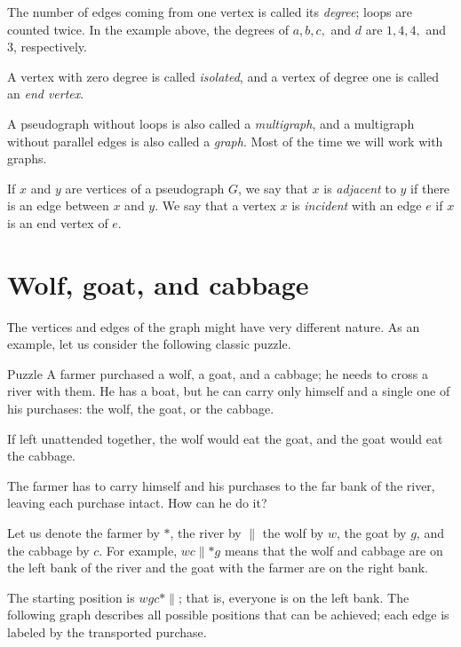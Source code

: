 The number of edges coming from one vertex is called its \emph{degree}; loops are counted twice.
In the example above,
the degrees of $a,b,c,$ and $d$ are $1,4,4,$ and $3$, respectively.

A vertex with zero degree is called \emph{isolated}, and a vertex of degree one is called an \emph{end vertex}.

\smallskip

A pseudograph without loops is also called a \emph{multigraph},
and a multigraph without parallel edges is also called a \emph{graph}.
Most of the time we will work with graphs.

If $x$ and $y$ are vertices of a pseudograph $G$, we say that $x$ is \emph{adjacent} to $y$ if there is an edge between $x$ and $y$.
We say that a vertex $x$ is \emph{incident} with an edge $e$ if $x$ is an end vertex of $e$.

\section{Wolf, goat, and cabbage}

Тhe vertices and edges of the graph might have very different nature.
As an example, let us consider the following classic puzzle.

\begin{thm}{Puzzle}
A farmer purchased a wolf, a goat, and a cabbage;
he needs to cross a river with them.
He has a boat, but he can carry only himself and a single one of his purchases: the wolf, the goat, or the cabbage.

If left unattended together, the wolf would eat the goat, and the goat would eat the cabbage.

The farmer has to carry himself and his purchases to the far bank of the river, leaving each purchase intact. How can he do it?
\end{thm}

Let us denote the farmer by $*$, the river by ${\parallel}$
the wolf by $w$, the goat by $g$, and the cabbage by $c$.
For example, $wc{\parallel}{*}g$ means that the wolf and cabbage are on the left bank of the river and the goat with the farmer are on the right bank.

{\sloppy

The starting position is $wgc{*}{\parallel}$; that is, everyone is on the left bank.
The following graph describes all possible positions that can be achieved;
each edge is labeled by the transported purchase.

}

